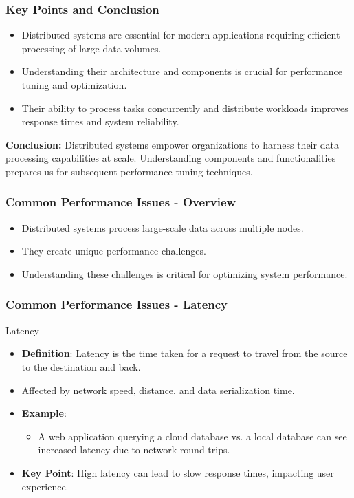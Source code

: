 \documentclass{beamer}
\begin{document}
\begin{frame}[fragile]
    \frametitle{Key Points and Conclusion}
    \begin{itemize}
        \item Distributed systems are essential for modern applications requiring efficient processing of large data volumes.
        \item Understanding their architecture and components is crucial for performance tuning and optimization.
        \item Their ability to process tasks concurrently and distribute workloads improves response times and system reliability.
    \end{itemize}
    
    \textbf{Conclusion:} Distributed systems empower organizations to harness their data processing capabilities at scale. Understanding components and functionalities prepares us for subsequent performance tuning techniques.
\end{frame}

\begin{frame}[fragile]
    \frametitle{Common Performance Issues - Overview}
    \begin{itemize}
        \item Distributed systems process large-scale data across multiple nodes.
        \item They create unique performance challenges.
        \item Understanding these challenges is critical for optimizing system performance.
    \end{itemize}
\end{frame}

\begin{frame}[fragile]
    \frametitle{Common Performance Issues - Latency}
    \begin{block}{Latency}
        \begin{itemize}
            \item \textbf{Definition}: Latency is the time taken for a request to travel from the source to the destination and back.
            \item Affected by network speed, distance, and data serialization time.
            \item \textbf{Example}: 
                \begin{itemize}
                    \item A web application querying a cloud database vs. a local database can see increased latency due to network round trips.
                \end{itemize}
            \item \textbf{Key Point}: High latency can lead to slow response times, impacting user experience.
        \end{itemize}
    \end{block}
\end{frame}
\end{document}
